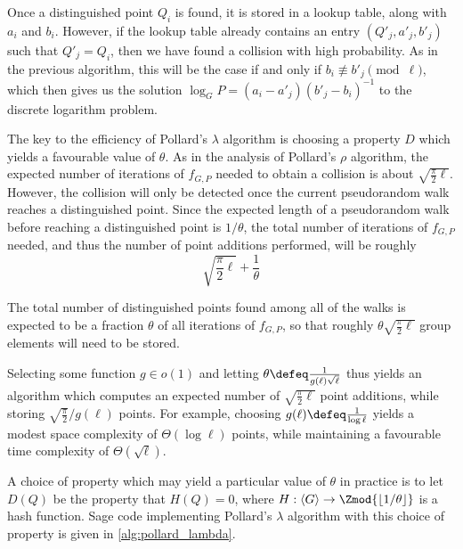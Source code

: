Once a distinguished point $Q_i$ is found, it is stored in a lookup table, along with $a_i$ and $b_i$. However, if the lookup table already contains an entry $(Q'_j, a'_j, b'_j)$ such that $Q'_j = Q_i$, then we have found a collision with high probability. As in the previous algorithm, this will be the case if and only if $b_i \not\equiv b'_j \pmod{\ell}$, which then gives us the solution $\log_G P = (a_i - a'_j) (b'_j - b_i)^{-1}$ to the discrete logarithm problem.

The key to the efficiency of Pollard's $\lambda$ algorithm is choosing a property $D$ which yields a favourable value of $\theta$. As in the analysis of Pollard's $\rho$ algorithm, the expected number of iterations of $f_{G, P}$ needed to obtain a collision is about $\sqrt{\frac{\pi}{2} \ell}$. However, the collision will only be detected once the current pseudorandom walk reaches a distinguished point. Since the expected length of a pseudorandom walk before reaching a distinguished point is $1 / \theta$, the total number of iterations of $f_{G, P}$ needed, and thus the number of point additions performed, will be roughly
\[
\sqrt{\frac{\pi}{2} \ell} + \frac{1}{\theta}
\]

The total number of distinguished points found among all of the walks is expected to be a fraction $\theta$ of all iterations of $f_{G, P}$, so that roughly $\theta \sqrt{\frac{\pi}{2} \ell}$ group elements will need to be stored.

Selecting some function $g \in o(1)$ and letting $\theta \defeq \frac{1}{g(\ell) \sqrt{\ell}}$ thus yields an algorithm which computes an expected number of $\sqrt{\frac{\pi}{2} \ell}$ point additions, while storing $\sqrt{\frac{\pi}{2}} / g(\ell)$ points. For example, choosing $g(\ell) \defeq \frac{1}{\log \ell}$ yields a modest space complexity of $\Theta(\log \ell)$ points, while maintaining a favourable time complexity of $\Theta(\sqrt{\ell})$.

A choice of property which may yield a particular value of $\theta$ in practice is to let $D(Q)$ be the property that $H(Q) = 0$, where $H : \langle G \rangle \to \Zmod{\lfloor 1 / \theta \rfloor}$ is a hash function. Sage code implementing Pollard's $\lambda$ algorithm with this choice of property is given in \cref{alg:pollard_lambda}.


